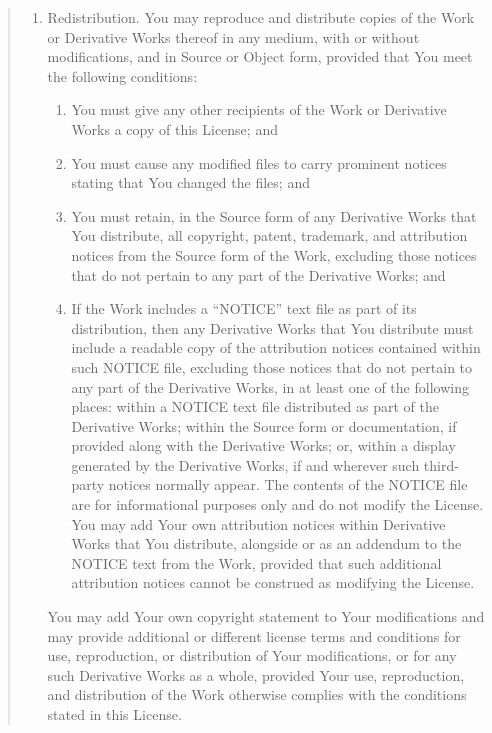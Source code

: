 \documentclass[letterpaper,10pt,english]{sphinxmanual}
\begin{document}
\begin{quote}
\begin{enumerate}
\item {} 
Redistribution. You may reproduce and distribute copies of the
Work or Derivative Works thereof in any medium, with or without
modifications, and in Source or Object form, provided that You
meet the following conditions:
\begin{enumerate}
\def\theenumii{\alph{enumii}}
\def\labelenumii{(\theenumii )}
\makeatletter\def\p@enumiii{\p@enumii (\theenumii )}\makeatother
\item {} 
You must give any other recipients of the Work or
Derivative Works a copy of this License; and

\item {} 
You must cause any modified files to carry prominent notices
stating that You changed the files; and

\item {} 
You must retain, in the Source form of any Derivative Works
that You distribute, all copyright, patent, trademark, and
attribution notices from the Source form of the Work,
excluding those notices that do not pertain to any part of
the Derivative Works; and

\item {} 
If the Work includes a “NOTICE” text file as part of its
distribution, then any Derivative Works that You distribute must
include a readable copy of the attribution notices contained
within such NOTICE file, excluding those notices that do not
pertain to any part of the Derivative Works, in at least one
of the following places: within a NOTICE text file distributed
as part of the Derivative Works; within the Source form or
documentation, if provided along with the Derivative Works; or,
within a display generated by the Derivative Works, if and
wherever such third-party notices normally appear. The contents
of the NOTICE file are for informational purposes only and
do not modify the License. You may add Your own attribution
notices within Derivative Works that You distribute, alongside
or as an addendum to the NOTICE text from the Work, provided
that such additional attribution notices cannot be construed
as modifying the License.

\end{enumerate}

You may add Your own copyright statement to Your modifications and
may provide additional or different license terms and conditions
for use, reproduction, or distribution of Your modifications, or
for any such Derivative Works as a whole, provided Your use,
reproduction, and distribution of the Work otherwise complies with
the conditions stated in this License.


\end{enumerate}
\end{quote}
\end{document}
